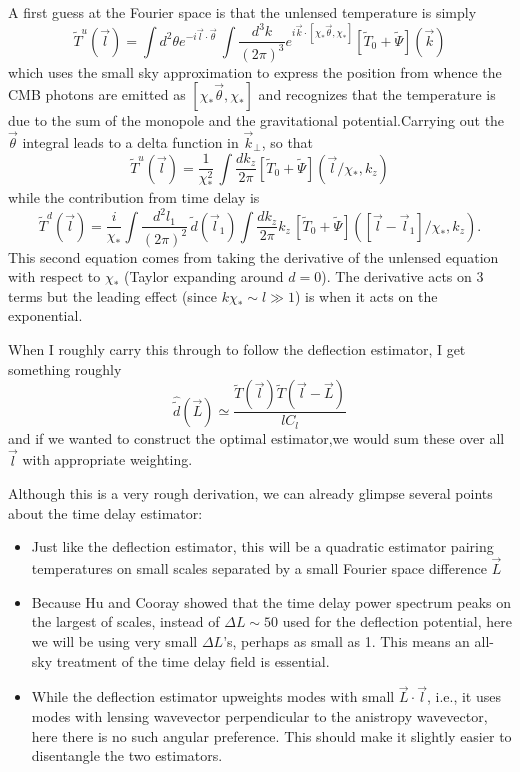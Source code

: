 \documentclass[prd,amsmath,amssymb,floatfix,superscriptaddress,nofootinbib,preprintnumbers]{revtex4-1}
\begin{document}
A first guess at the Fourier space is
that the unlensed temperature is simply
\begin{equation}
\tilde T^u(\vec l) = \int d^2\theta e^{-i\vec l\cdot \vec\theta}\, \int \frac{d^3k}{(2\pi)^3} e^{i\vec k\cdot [\chi_*\vec\theta,\chi_*]}  [\tilde T_0+\tilde\Psi](\vec k)
\end{equation}
which uses the small sky approximation to express the position from whence the CMB photons are emitted as $[\chi_*\vec\theta,\chi_*]$ and recognizes that the temperature is due to the sum of the monopole and the gravitational potential.Carrying out the $\vec\theta$ integral leads to a delta function in $\vec k_\perp$, so that 
\begin{equation}
\tilde T^u(\vec l) = 
\frac{1}{\chi_*^2}\, \int \frac{dk_z}{2\pi}  [\tilde T_0+\tilde\Psi](\vec l/\chi_*,k_z)
\end{equation}
while the contribution from time delay is
\begin{equation}
\tilde T^d(\vec l) = \frac{i}{\chi_*} \int \frac{d^2l_1}{(2\pi)^2}\, \tilde d(\vec l_1) \int \frac{dk_z}{2\pi} k_z\, [\tilde T_0+\tilde\Psi]([\vec l-\vec l_1]/\chi_*,k_z).
\end{equation}
This second equation comes from taking the derivative of the unlensed equation with respect to $\chi_*$ (Taylor expanding around $d=0$). The derivative acts on 3 terms but the leading effect (since $k\chi_*\sim l\gg 1$) is when it acts on the exponential.

When I roughly carry this through to follow the deflection estimator, I get something roughly 
\begin{equation}
\hat{\tilde d}(\vec L) \simeq \frac{\tilde T(\vec l) \tilde T(\vec l -\vec L)}{lC_l}
\end{equation}
and if we wanted to construct the optimal estimator,we would sum these over all $\vec l$ with appropriate weighting.

Although this is a very rough derivation, we can already glimpse several points about the time delay estimator:
\begin{itemize}
\item Just like the deflection estimator, this will be a quadratic estimator pairing temperatures on small scales separated by a small Fourier space difference $\vec L$
\item Because Hu and Cooray showed that the time delay power spectrum peaks on the largest of scales, instead of $\Delta L\sim 50$ used for the deflection potential, here we will be using very small $\Delta L$'s, perhaps as small as 1. This means an all-sky treatment of the time delay field is essential.
\item While the deflection estimator upweights modes with small $\vec L\cdot \vec l$, i.e., it uses modes with lensing wavevector perpendicular to the anistropy wavevector, here there is no such angular preference. This should make it slightly easier to disentangle the two estimators.
\end{itemize}
\end{document}
